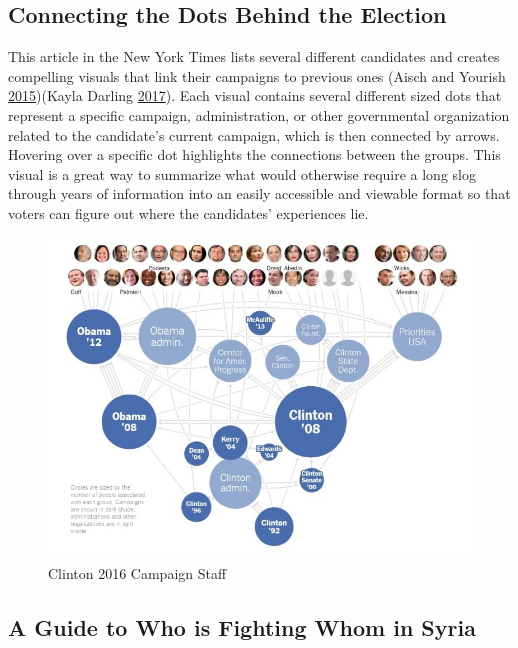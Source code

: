 \documentclass[]{book}
\begin{document}
\hypertarget{connecting-the-dots-behind-the-election}{%
\subsection{Connecting the Dots Behind the Election}\label{connecting-the-dots-behind-the-election}}

This article in the New York Times lists several different candidates and creates compelling visuals that link their campaigns to previous ones (Aisch and Yourish \protect\hyperlink{ref-campaign_staff}{2015})(Kayla Darling \protect\hyperlink{ref-cool_data}{2017}). Each visual contains several different sized dots that represent a specific campaign, administration, or other governmental organization related to the candidate's current campaign, which is then connected by arrows. Hovering over a specific dot highlights the connections between the groups. This visual is a great way to summarize what would otherwise require a long slog through years of information into an easily accessible and viewable format so that voters can figure out where the candidates' experiences lie.

\begin{figure}
\centering
\includegraphics{images/NewClinton.png}
\caption{Clinton 2016 Campaign Staff}
\end{figure}

\hypertarget{a-guide-to-who-is-fighting-whom-in-syria}{%
\subsection{A Guide to Who is Fighting Whom in Syria}\label{a-guide-to-who-is-fighting-whom-in-syria}}
\end{document}
